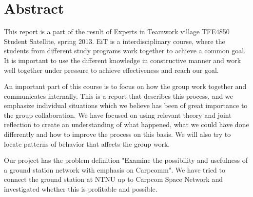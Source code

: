 \section*{Abstract}

This report is a part of the result of Experts in Teamwork village TFE4850 Student Satellite, spring 2013. EiT is a interdisciplinary course, where the students from different study programs work together to achieve a common goal. It is important to use the different knowledge in constructive manner and work well together under pressure to achieve effectiveness and reach our goal. 

An important part of this course is to focus on how the group work together and communicates internally. This is a report that describes this process, and we emphasize individual situations which we believe has been of great importance to the group collaboration. We have focused on using relevant theory and joint reflection to create an understanding of what happened,  what we could have done differently and how to improve the process on this basis. We will also try to locate patterns of behavior that affects the group work. 

Our project has the problem definition "Examine the possibility and usefulness of a ground station network with emphasis on Carpcomm". We have tried to connect the ground station at NTNU up to Carpcom Space Network and investigated whether this is profitable and possible. 



